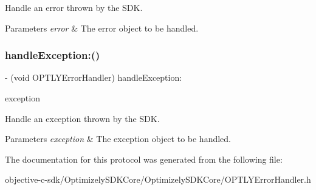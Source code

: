 Handle an error thrown by the S\+DK. 
\begin{DoxyParams}{Parameters}
{\em error} & The error object to be handled. \\
\hline
\end{DoxyParams}
\mbox{\label{protocol_o_p_t_l_y_error_handler_01-p_a3540e8a0461cc0d9d3b117ca3febda23}} 
\subsubsection{\texorpdfstring{handle\+Exception\+:()}{handleException:()}}
{\footnotesize\ttfamily -\/ (void O\+P\+T\+L\+Y\+Error\+Handler) handle\+Exception\+: \begin{DoxyParamCaption}\item[{(N\+S\+Exception $\ast$)}]{exception }\end{DoxyParamCaption}}

Handle an exception thrown by the S\+DK. 
\begin{DoxyParams}{Parameters}
{\em exception} & The exception object to be handled. \\
\hline
\end{DoxyParams}


The documentation for this protocol was generated from the following file\+:\begin{DoxyCompactItemize}
\item 
objective-\/c-\/sdk/\+Optimizely\+S\+D\+K\+Core/\+Optimizely\+S\+D\+K\+Core/O\+P\+T\+L\+Y\+Error\+Handler.\+h\end{DoxyCompactItemize}
